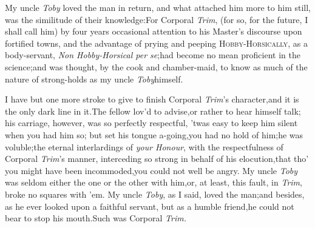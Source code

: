 \documentclass{article}
\begin{document}
My uncle \textit{Toby} loved the man in return, and what attached
him more to\break
him still, was the similitude of their\break
knowledge:\tsh For Corporal \textit{Trim}, (for\break 
so, for the future, I shall call him) by\break
four years occasional attention to his\break
Master’s discourse upon fortified towns,\break
and the advantage of prying and peeping\break
{}
\textsc{Hobby-Horsically}, as a body-servant,
\textit{Non Hobby-Horsical per se};\tsh had become no mean
proficient in the science;\break and was thought, by the cook and
cham\-ber-maid, to know as much of the nature of
strong-holds as my uncle \textit{Toby}\break himself.\\

\newpage
I have but one more stroke to give to finish Corporal
\textit{Trim}’s character,\tsk and it is the only dark
line in it.\tsk The fellow lov’d to advise,\tsk or rather to
hear himself talk; his carriage, however, was so perfectly
respectful, ’twas easy to keep him silent when you had him
so; but set his tongue a-going,\tsk you had no hold of
him;\tsk he was voluble;\tsk the eternal interlardings of
\textit{your Honour}, with the respectfulness of Corporal
\textit{Trim}’s manner, interceding so strong in behalf of his
elocution,\tsk that tho’ you might have been
incommoded,\tsk you could not well be angry. My uncle
\textit{Toby} was seldom either the one or the other with
him,\tsk\break or, at least, this fault, in \textit{Trim}, broke no
squares with ’em. My uncle \textit{Toby}, as I said, loved the
man;\tsh and besides, as he ever looked upon a faithful
servant,\tsk\break
but as a humble friend,\tsk he could not bear to
stop his mouth.\tsh Such was Corporal \textit{Trim.}
\end{document}

